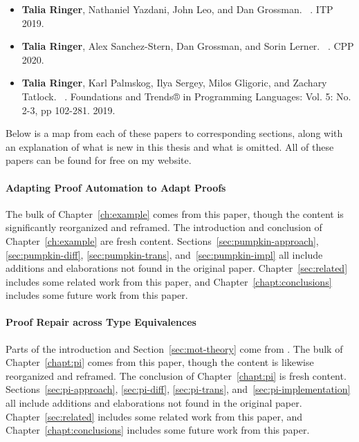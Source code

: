 \begin{itemize}
\item \textbf{Talia Ringer}, Nathaniel Yazdani, John Leo, and Dan Grossman. ~\cite{Ringer2019}. ITP 2019.
\item \textbf{Talia Ringer}, Alex Sanchez-Stern, Dan Grossman, and Sorin Lerner. ~\cite{replica}. CPP 2020.
\item \textbf{Talia Ringer}, Karl Palmskog, Ilya Sergey, Milos Gligoric, and Zachary Tatlock. ~\cite{PGL-045}. Foundations and Trends® in Programming Languages: Vol. 5: No. 2-3, pp 102-281. 2019. 
\end{itemize}
Below is a map from each of these papers to corresponding sections,
along with an explanation of what is new in this thesis and what is omitted.
All of these papers can be found for free on my website.

\paragraph{Adapting Proof Automation to Adapt Proofs}
The bulk of Chapter~\ref{ch:example} comes from this paper,
though the content is significantly reorganized and reframed.
The introduction and conclusion of Chapter~\ref{ch:example} are fresh content.
Sections~\ref{sec:pumpkin-approach}, \ref{sec:pumpkin-diff}, \ref{sec:pumpkin-trans}, and~\ref{sec:pumpkin-impl}
all include additions and elaborations not found in the original paper.
Chapter~\ref{sec:related} includes some related work from this paper,
and Chapter~\ref{chapt:conclusions} includes some future work from this paper.

\paragraph{Proof Repair across Type Equivalences}
Parts of the introduction and Section~\ref{sec:mot-theory} come from .
The bulk of Chapter~\ref{chapt:pi} comes from this paper,
though the content is likewise reorganized and reframed.
The conclusion of Chapter~\ref{chapt:pi} is fresh content.
Sections~\ref{sec:pi-approach}, \ref{sec:pi-diff}, \ref{sec:pi-trans}, and~\ref{sec:pi-implementation}
all include additions and elaborations not found in the original paper.
Chapter~\ref{sec:related} includes some related work from this paper,
and Chapter~\ref{chapt:conclusions} includes some future work from this paper.

